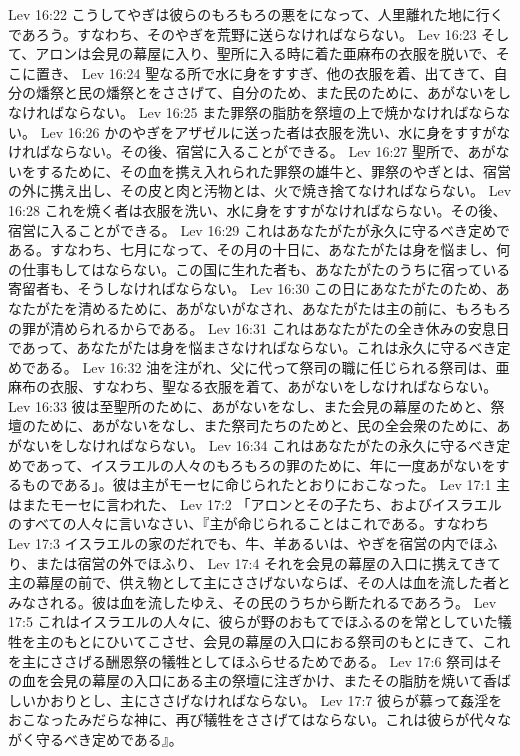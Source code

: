 Lev 16:22  こうしてやぎは彼らのもろもろの悪をになって、人里離れた地に行くであろう。すなわち、そのやぎを荒野に送らなければならない。
Lev 16:23  そして、アロンは会見の幕屋に入り、聖所に入る時に着た亜麻布の衣服を脱いで、そこに置き、
Lev 16:24  聖なる所で水に身をすすぎ、他の衣服を着、出てきて、自分の燔祭と民の燔祭とをささげて、自分のため、また民のために、あがないをしなければならない。
Lev 16:25  また罪祭の脂肪を祭壇の上で焼かなければならない。
Lev 16:26  かのやぎをアザゼルに送った者は衣服を洗い、水に身をすすがなければならない。その後、宿営に入ることができる。
Lev 16:27  聖所で、あがないをするために、その血を携え入れられた罪祭の雄牛と、罪祭のやぎとは、宿営の外に携え出し、その皮と肉と汚物とは、火で焼き捨てなければならない。
Lev 16:28  これを焼く者は衣服を洗い、水に身をすすがなければならない。その後、宿営に入ることができる。
Lev 16:29  これはあなたがたが永久に守るべき定めである。すなわち、七月になって、その月の十日に、あなたがたは身を悩まし、何の仕事もしてはならない。この国に生れた者も、あなたがたのうちに宿っている寄留者も、そうしなければならない。
Lev 16:30  この日にあなたがたのため、あなたがたを清めるために、あがないがなされ、あなたがたは主の前に、もろもろの罪が清められるからである。
Lev 16:31  これはあなたがたの全き休みの安息日であって、あなたがたは身を悩まさなければならない。これは永久に守るべき定めである。
Lev 16:32  油を注がれ、父に代って祭司の職に任じられる祭司は、亜麻布の衣服、すなわち、聖なる衣服を着て、あがないをしなければならない。
Lev 16:33  彼は至聖所のために、あがないをなし、また会見の幕屋のためと、祭壇のために、あがないをなし、また祭司たちのためと、民の全会衆のために、あがないをしなければならない。
Lev 16:34  これはあなたがたの永久に守るべき定めであって、イスラエルの人々のもろもろの罪のために、年に一度あがないをするものである」。彼は主がモーセに命じられたとおりにおこなった。
Lev 17:1  主はまたモーセに言われた、
Lev 17:2  「アロンとその子たち、およびイスラエルのすべての人々に言いなさい、『主が命じられることはこれである。すなわち
Lev 17:3  イスラエルの家のだれでも、牛、羊あるいは、やぎを宿営の内でほふり、または宿営の外でほふり、
Lev 17:4  それを会見の幕屋の入口に携えてきて主の幕屋の前で、供え物として主にささげないならば、その人は血を流した者とみなされる。彼は血を流したゆえ、その民のうちから断たれるであろう。
Lev 17:5  これはイスラエルの人々に、彼らが野のおもてでほふるのを常としていた犠牲を主のもとにひいてこさせ、会見の幕屋の入口におる祭司のもとにきて、これを主にささげる酬恩祭の犠牲としてほふらせるためである。
Lev 17:6  祭司はその血を会見の幕屋の入口にある主の祭壇に注ぎかけ、またその脂肪を焼いて香ばしいかおりとし、主にささげなければならない。
Lev 17:7  彼らが慕って姦淫をおこなったみだらな神に、再び犠牲をささげてはならない。これは彼らが代々ながく守るべき定めである』。
